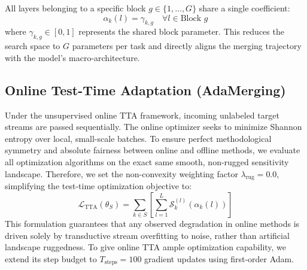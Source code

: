 \begin{enumerate}
All layers belonging to a specific block $g \in \{1, \dots, G\}$ share a single coefficient:
    \begin{equation}
    \label{eq:grouping}
    \alpha_k(l) = \gamma_{k, g} \quad \forall l \in \text{Block } g
    \end{equation}
    where $\gamma_{k, g} \in [0, 1]$ represents the shared block parameter.
This reduces the search space to $G$ parameters per task and directly aligns the merging trajectory with the model's macro-architecture.
\end{enumerate}

\subsection{Online Test-Time Adaptation (AdaMerging)}
Under the unsupervised online TTA framework, incoming unlabeled target streams are passed sequentially.
The online optimizer seeks to minimize Shannon entropy over local, small-scale batches.
To ensure perfect methodological symmetry and absolute fairness between online and offline methods, we evaluate all optimization algorithms on the exact same smooth, non-rugged sensitivity landscape.
Therefore, we set the non-convexity weighting factor $\lambda_{\text{rug}} = 0.0$, simplifying the test-time optimization objective to:
\begin{equation}
\label{eq:tta_loss}
\mathcal{L}_{\text{TTA}}(\theta_S) = \sum_{k \in S} \left[ \sum_{l=1}^L \mathcal{S}_k^{(l)}\left(\alpha_k(l)\right) \right]
\end{equation}
This formulation guarantees that any observed degradation in online methods is driven solely by transductive stream overfitting to noise, rather than artificial landscape ruggedness.
To give online TTA ample optimization capability, we extend its step budget to $T_{\text{steps}} = 100$ gradient updates using first-order Adam.

